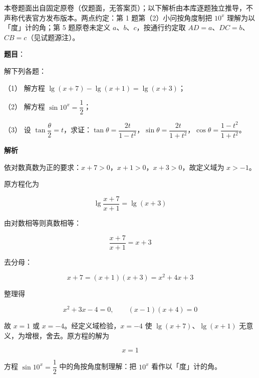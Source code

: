 

\begin{gktip}
本卷题面出自固定原卷（仅题面，无答案页）；以下解析由本库逐题独立推导，不声称代表官方发布版本。两点约定：第 1 题第（2）小问按角度制把 $10^{x}$ 理解为以「度」计的角；第 5 题原卷未定义 $a$、$b$、$c$，按通行约定取 $AD=a$、$DC=b$、$CB=c$（见试题源注）。
\end{gktip}

\begin{answer}

\textbf{题目}：

解下列各题：

（1） 解方程 $\lg(x+7)-\lg(x+1)=\lg(x+3)$；

（2） 解方程 $\sin 10^{x}=\dfrac{1}{2}$；

（3） 设 $\tan\dfrac{\theta}{2}=t$，求证：$\tan\theta=\dfrac{2t}{1-t^{2}}$，$\sin\theta=\dfrac{2t}{1+t^{2}}$，$\cos\theta=\dfrac{1-t^{2}}{1+t^{2}}$。

\textbf{解析}


依对数真数为正的要求：$x+7>0$，$x+1>0$，$x+3>0$，故定义域为 $x>-1$。

原方程化为

\nopagebreak[4]
\[
\lg\frac{x+7}{x+1}=\lg(x+3)
\]

由对数相等则真数相等：

\nopagebreak[4]
\[
\frac{x+7}{x+1}=x+3
\]

去分母：

\nopagebreak[4]
\[
x+7=(x+1)(x+3)=x^{2}+4x+3
\]

整理得

\nopagebreak[4]
\[
x^{2}+3x-4=0,\qquad (x-1)(x+4)=0
\]

故 $x=1$ 或 $x=-4$。经定义域检验，$x=-4$ 使 $\lg(x+7)$、$\lg(x+1)$ 无意义，为增根，舍去。原方程的解为

\nopagebreak[4]
\[
x=1
\]


方程 $\sin 10^{x}=\dfrac{1}{2}$ 中的角按角度制理解：把 $10^{x}$ 看作以「度」计的角。


\end{answer}
